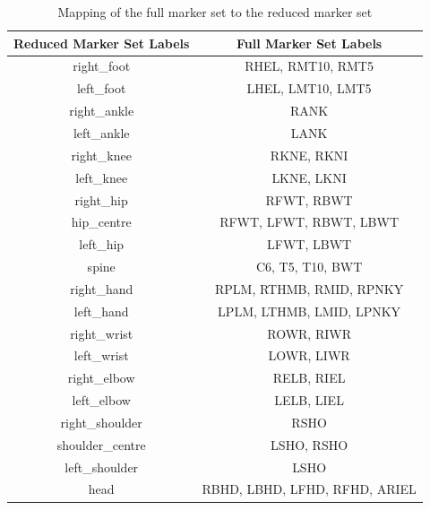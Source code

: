 \begin{table}[H]
    \centering
    \begin{tabular}{|c|c|}
        \hline
        \textbf{Reduced Marker Set Labels} & \textbf{Full Marker Set Labels} \\
        \hline
        right\_foot & RHEL, RMT10, RMT5 \\
        left\_foot & LHEL, LMT10, LMT5 \\
        right\_ankle & RANK \\
        left\_ankle & LANK \\
        right\_knee & RKNE, RKNI \\
        left\_knee & LKNE, LKNI \\
        right\_hip & RFWT, RBWT \\
        hip\_centre & RFWT, LFWT, RBWT, LBWT \\
        left\_hip & LFWT, LBWT \\
        spine & C6, T5, T10, BWT \\
        right\_hand & RPLM, RTHMB, RMID, RPNKY\\
        left\_hand & LPLM, LTHMB, LMID, LPNKY \\
        right\_wrist & ROWR, RIWR \\
        left\_wrist & LOWR, LIWR \\
        right\_elbow & RELB, RIEL\\
        left\_elbow & LELB, LIEL \\
        right\_shoulder & RSHO \\
        shoulder\_centre & LSHO, RSHO \\
        left\_shoulder & LSHO \\
        head & RBHD, LBHD, LFHD, RFHD, ARIEL \\
        \hline
    \end{tabular}
    \caption{Mapping of the full marker set to the reduced marker set}
    \label{tab:labels_joints}
\end{table}
